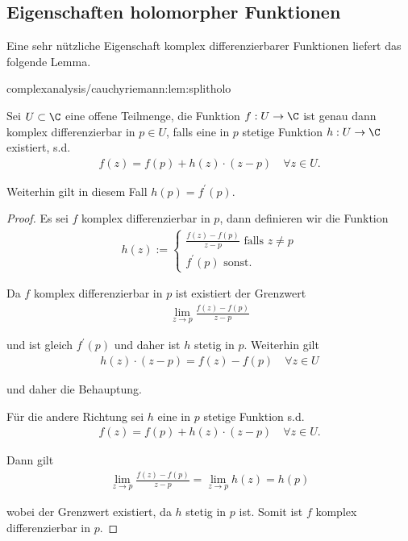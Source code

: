 \documentclass[letterpaper,10pt,german]{jupyterBook}
\begin{document}
\subsection{Eigenschaften holomorpher Funktionen}
\label{\detokenize{complexanalysis/cauchyriemann:eigenschaften-holomorpher-funktionen}}
\par
Eine sehr nützliche Eigenschaft komplex differenzierbarer Funktionen liefert das folgende Lemma.
\begin{lemma}{}{complexanalysis/cauchyriemann:lem:splitholo}



\par
Sei \(U \subset \C\) eine offene Teilmenge, die Funktion \(f:U\to\C\) ist genau dann komplex differenzierbar in \(p\in U\), falls eine in \(p\) stetige Funktion \(h:U\to\C\) existiert, s.d.
\begin{align*}
f(z) = f(p) + h(z)\cdot (z-p)\quad\forall z\in U.
\end{align*}
\par
Weiterhin gilt in diesem Fall \(h(p) = f^\prime(p)\).
\end{lemma}

\begin{proof}
 Es sei \(f\) komplex differenzierbar in \(p\), dann definieren wir die Funktion
\begin{align*}
h(z):=
\begin{cases}
\frac{f(z) - f(p)}{z-p}\text{ falls }z\neq p\\
f^\prime(p)\text{ sonst.}
\end{cases}
\end{align*}
\par
Da \(f\) komplex differenzierbar in \(p\) ist existiert der Grenzwert
\begin{align*}
\lim_{z\to p} \frac{f(z) - f(p)}{z-p}
\end{align*}
\par
und ist gleich \(f^\prime(p)\) und daher ist \(h\) stetig in \(p\). Weiterhin gilt
\begin{align*}
h(z)\cdot (z-p) = f(z) - f(p)\quad\forall z\in U
\end{align*}
\par
und daher die Behauptung.

\par
Für die andere Richtung sei \(h\) eine in \(p\) stetige Funktion s.d.
\begin{align*}
f(z) = f(p) + h(z)\cdot (z-p)\quad\forall z\in U.
\end{align*}
\par
Dann gilt
\begin{align*}
\lim_{z\to p} \frac{f(z) - f(p)}{z-p} = \lim_{z\to p} h(z) = h(p)
\end{align*}
\par
wobei der Grenzwert existiert, da \(h\) stetig in \(p\) ist. Somit ist \(f\) komplex differenzierbar in \(p\).
\end{proof}
\end{document}

